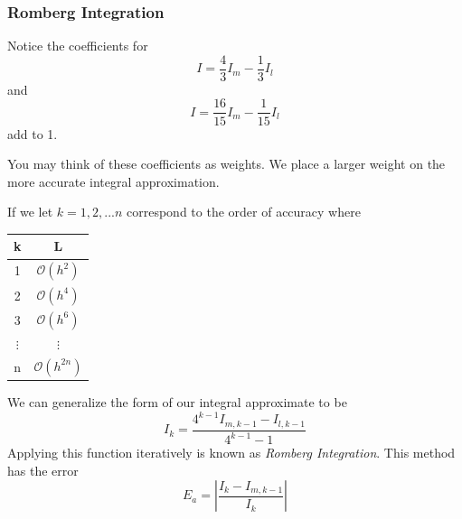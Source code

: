 \documentclass{if-beamer}
\begin{document}
\begin{frame}[t]
	\frametitle{Romberg Integration}
	Notice the coefficients for
	$$ I = \frac{4}{3}I_m -\frac{1}{3}I_l$$
	and
	$$ I = \frac{16}{15}I_m -\frac{1}{15}I_l$$
	add to 1. \\\vspace{10pt}
	
	You may think of these coefficients as weights. We place a larger weight on the more accurate integral approximation. \\\vspace{10pt}
	
	If we let $k = 1,2,...n$ correspond to the order of accuracy where \\
	\begin{minipage}{0.3\textwidth}
		\begin{table}
			\begin{tabular}{c | c }
				k & L\\
				\hline
				1 & $\mathcal{O}(h^2)$ \\
				2 & $\mathcal{O}(h^4)$ \\
				3 & $\mathcal{O}(h^6)$ \\
				$\vdots$ & $\vdots$ \\
				n & $\mathcal{O}(h^{2n})$ \\
			\end{tabular}
		\end{table}
	\end{minipage}
	\begin{minipage}{0.7\textwidth}
		We can generalize the form of our integral approximate to be\\	
		$$ I_k = \frac{4^{k-1}I_{m, k-1}-I_{l,k-1}}{4^{k-1}-1}$$
		Applying this function iteratively is known as \textit{Romberg Integration}. This method has the error
		$$E_a = \left|\frac{I_k - I_{m,k-1}}{I_k}\right| $$		
	\end{minipage}
\end{frame}
\end{document}
